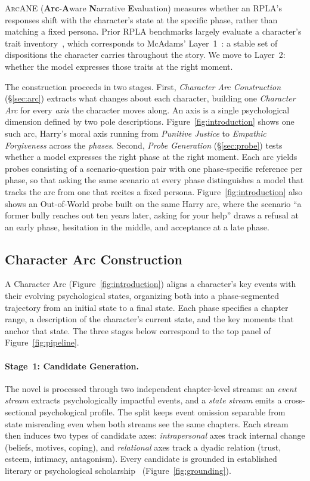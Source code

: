 \documentclass[11pt]{article}
\newcommand{\ours}{\textsc{ArcANE}}
\begin{document}
\ours{} (\textbf{Arc}-\textbf{A}ware \textbf{N}arrative \textbf{E}valuation) measures whether an RPLA's responses shift with the character's state at the specific phase, rather than matching a fixed persona. Prior RPLA benchmarks largely evaluate a character's trait inventory~\cite{huang2024psychobench, wang-etal-2024-incharacter}, which corresponds to McAdams' Layer~1~\cite{Mcadams1999, Mcadams2013}: a stable set of dispositions the character carries throughout the story. We move to Layer~2: whether the model expresses those traits at the right moment.

The construction proceeds in two stages. First, \emph{Character Arc Construction} (\S\ref{sec:arc}) extracts what changes about each character, building one \emph{Character Arc} for every \emph{axis} the character moves along. An axis is a single psychological dimension defined by two pole descriptions. Figure~\ref{fig:introduction} shows one such arc, Harry's moral axis running from \textit{Punitive Justice} to \textit{Empathic Forgiveness} across the \emph{phases}. Second, \emph{Probe Generation} (\S\ref{sec:probe}) tests whether a model expresses the right phase at the right moment. Each arc yields probes consisting of a scenario-question pair with one phase-specific reference per phase, so that asking the same scenario at every phase distinguishes a model that tracks the arc from one that recites a fixed persona. Figure~\ref{fig:introduction} also shows an Out-of-World probe built on the same Harry arc, where the scenario ``a former bully reaches out ten years later, asking for your help'' draws a refusal at an early phase, hesitation in the middle, and acceptance at a late phase.

\subsection{Character Arc Construction\label{sec:arc}}

A Character Arc (Figure~\ref{fig:introduction}) aligns a character's key events with their evolving psychological states, organizing both into a phase-segmented trajectory from an initial state to a final state. Each phase specifies a chapter range, a description of the character's current state, and the key moments that anchor that state. The three stages below correspond to the top panel of Figure~\ref{fig:pipeline}.

\paragraph{Stage~1: Candidate Generation.}
The novel is processed through two independent chapter-level streams: an \emph{event stream} extracts psychologically impactful events, and a \emph{state stream} emits a cross-sectional psychological profile. The split keeps event omission separable from state misreading even when both streams see the same chapters. Each stream then induces two types of candidate axes: \emph{intrapersonal} axes track internal change (beliefs, motives, coping), and \emph{relational} axes track a dyadic relation (trust, esteem, intimacy, antagonism). Every candidate is grounded in established literary or psychological scholarship~\cite{huang2025values} (Figure~\ref{fig:grounding}).
\end{document}
